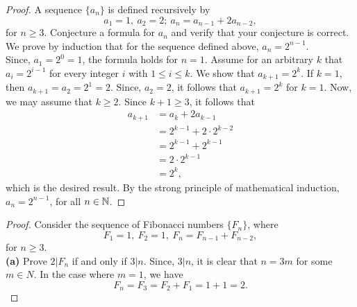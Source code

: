 \documentclass[12pt]{article}
\begin{document}
    \begin{proof}{A sequence \(\{a_n\}\) is defined recursively by
        \begin{equation*}
            a_1 = 1,\ a_2=2;\ a_n=a_{n-1} + 2a_{n-2},
        \end{equation*}
        for \(n\geq3\). Conjecture a formula for \(a_n\) and verify that your conjecture is correct.}
        We prove by induction that for the sequence defined above, \(a_n=2^{n-1}\). \\
        Since, \(a_1=2^0=1\), the formula holds for \(n=1\). Assume for an arbitrary \(k\) that \(a_i=2^{i-1}\) for every integer \(i\) with \(1\leq i \leq k\). We show that \(a_{k+1} = 2^k\). If \(k=1\), then \(a_{k+1} = a_2=2^1=2\). Since, \(a_2=2\), it follows that \(a_{k+1} = 2^k\) for \(k=1\). Now, we may assume that \(k\geq2\). Since \(k+1\geq3\), it follows that
        \begin{equation*}
            \begin{split}
                a_{k+1} &= a_{k} + 2a_{k-1}\\
                & = 2^{k-1} + 2\cdot2^{k-2}\\
                & = 2^{k-1} + 2^{k-1}\\
                & = 2\cdot 2^{k-1}\\
                &= 2^{k},
            \end{split}
        \end{equation*}
        which is the desired result. By the strong principle of mathematical induction, \(a_n=2^{n-1}\), for all \(n\in\mathbb{N}\).
    \end{proof}
    \begin{proof}{Consider the sequence of Fibonacci numbers \(\{F_n\}\), where
        \begin{equation*}
            F_1 = 1,\ F_2 =1,\ F_n=F_{n-1} + F_{n-2},
        \end{equation*}
        for \(n\geq3\).\\
        \textbf{(a)} Prove \(2|F_n\) if and only if \(3|n\).}
        Since, \(3|n\), it is clear that \(n=3m\) for some \(m\in N\). In the case where \(m=1\), we have
        \begin{equation*}
            F_n=F_3=F_2+F_1=1+1=2.
        \end{equation*}
    \end{proof}
\end{document}
